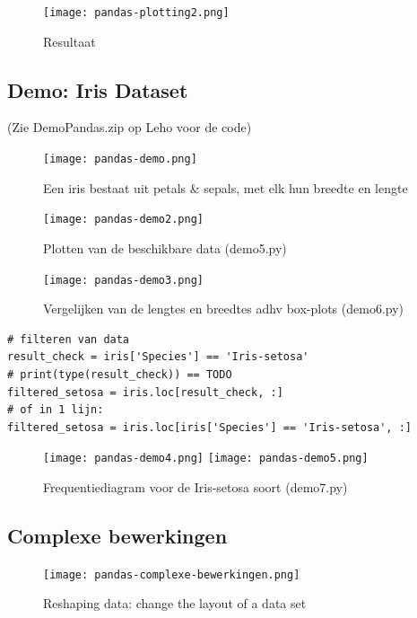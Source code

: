 \documentclass{article}
\begin{document}
\begin{figure}[H]
    \centering
    \texttt{[image: pandas-plotting2.png]}
    \caption{Resultaat}
\end{figure}

\subsection{Demo: Iris Dataset}

(Zie DemoPandas.zip op Leho voor de code)

\begin{figure}[H]
    \centering
    \texttt{[image: pandas-demo.png]}
    \caption{Een iris bestaat uit petals \& sepals, met elk hun breedte en lengte}
\end{figure}

\begin{figure}[H]
    \centering
    \texttt{[image: pandas-demo2.png]}
    \caption{Plotten van de beschikbare data (demo5.py)}
\end{figure}

\begin{figure}[H]
    \centering
    \texttt{[image: pandas-demo3.png]}
    \caption{Vergelijken van de lengtes en breedtes adhv box-plots (demo6.py)}
\end{figure}

\begin{verbatim}
# filteren van data
result_check = iris['Species'] == 'Iris-setosa'
# print(type(result_check)) == TODO
filtered_setosa = iris.loc[result_check, :]
# of in 1 lijn:
filtered_setosa = iris.loc[iris['Species'] == 'Iris-setosa', :]
\end{verbatim}

\begin{figure}[H]
    \centering
    \texttt{[image: pandas-demo4.png]}
    \texttt{[image: pandas-demo5.png]}
    \caption{Frequentiediagram voor de Iris-setosa soort (demo7.py)}
\end{figure}

\subsection{Complexe bewerkingen}

\begin{figure}[H]
    \centering
    \texttt{[image: pandas-complexe-bewerkingen.png]}
    \caption{Reshaping data: change the layout of a data set}
\end{figure}
\end{document}
